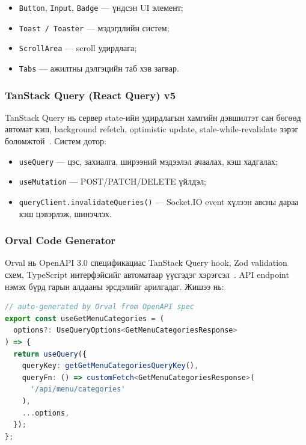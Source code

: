 \documentclass[12pt,a4paper]{article}
\begin{document}
\begin{itemize}
  \item \texttt{Button}, \texttt{Input}, \texttt{Badge} --- үндсэн UI элемент;
  \item \texttt{Toast / Toaster} --- мэдэгдлийн систем;
  \item \texttt{ScrollArea} --- scroll удирдлага;
  \item \texttt{Tabs} --- ажилтны дэлгэцийн таб хэв загвар.
\end{itemize}

\subsubsection{TanStack Query (React Query) v5}

TanStack Query нь сервер state-ийн удирдлагын хамгийн дэвшилтэт
сан бөгөөд автомат кэш, background refetch, optimistic update,
stale-while-revalidate зэрэг боломжтой~\cite{tanstack2024}.
Систем дотор:

\begin{itemize}
  \item \texttt{useQuery} --- цэс, захиалга, ширээний мэдээлэл
        ачаалах, кэш хадгалах;
  \item \texttt{useMutation} --- POST/PATCH/DELETE үйлдэл;
  \item \texttt{queryClient.invalidateQueries()} --- Socket.IO
        event хүлээн авсны дараа кэш цэвэрлэж, шинэчлэх.
\end{itemize}

\subsubsection{Orval Code Generator}

Orval нь OpenAPI 3.0 спецификациас TanStack Query hook, Zod
validation схем, TypeScript интерфэйсийг автоматаар үүсгэдэг
хэрэгсэл~\cite{orval2024}. API endpoint нэмэх бүрд гарын алдааны
эрсдэлийг арилгадаг. Жишээ нь:

\begin{lstlisting}[language=TypeScript, caption=Orval-р үүсгэсэн hook-ийн жишээ]
// auto-generated by Orval from OpenAPI spec
export const useGetMenuCategories = (
  options?: UseQueryOptions<GetMenuCategoriesResponse>
) => {
  return useQuery({
    queryKey: getGetMenuCategoriesQueryKey(),
    queryFn: () => customFetch<GetMenuCategoriesResponse>(
      '/api/menu/categories'
    ),
    ...options,
  });
};
\end{lstlisting}
\end{document}
